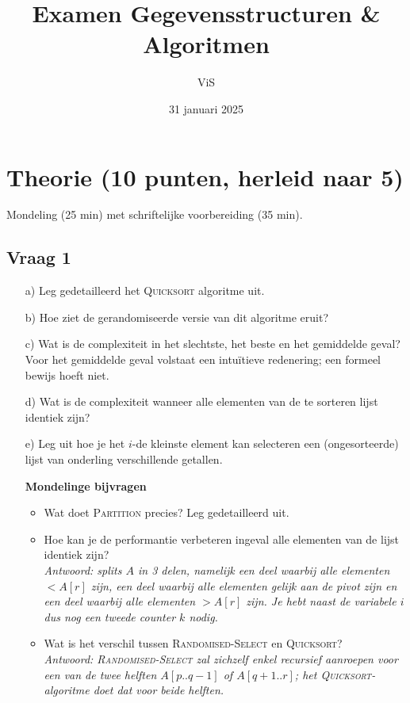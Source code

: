 \documentclass[kulak]{kulakarticle}
\title{Examen Gegevensstructuren \& Algoritmen}
\author{ViS}
\date{31 januari 2025}
\begin{document}
	\maketitle

	\section*{Theorie (10 punten, herleid naar 5)}

	Mondeling (25 min) met schriftelijke voorbereiding (35 min).

	\subsection*{Vraag 1}

	\begin{enumerate}
		\item[a)] Leg gedetailleerd het \textsc{Quicksort} algoritme uit.
		\item[b)] Hoe ziet de gerandomiseerde versie van dit algoritme eruit?
		\item[c)] Wat is de complexiteit in het slechtste, het beste en het gemiddelde geval? Voor het gemiddelde geval volstaat een intuïtieve redenering; een formeel bewijs hoeft niet.
		\item[d)] Wat is de complexiteit wanneer alle elementen van de te sorteren lijst identiek zijn?
		\item[e)] Leg uit hoe je het \(i\)-de kleinste element kan selecteren een (ongesorteerde) lijst van onderling verschillende getallen.
		\item[]\textbf{Mondelinge bijvragen}
		\begin{itemize}
			\item Wat doet \textsc{Partition} precies? Leg gedetailleerd uit.
			\item Hoe kan je de performantie verbeteren ingeval alle elementen van de lijst identiek zijn?\\
			\textit{Antwoord: splits \(A\) in 3 delen, namelijk een deel waarbij alle elementen \(< A[r]\) zijn, een deel waarbij alle elementen gelijk aan de pivot zijn en een deel waarbij alle elementen \(> A[r]\) zijn. Je hebt naast de variabele \(i\) dus nog een tweede counter \(k\) nodig.}
			\item Wat is het verschil tussen \textsc{Randomised-Select} en \textsc{Quicksort}?\\
			\textit{Antwoord: \textsc{Randomised-Select} zal zichzelf enkel recursief aanroepen voor een van de twee helften \(A[ p.. q-1]\) of \(A[q+1 .. r]\); het \textsc{Quicksort}-algoritme doet dat voor beide helften.}
		\end{itemize}
	\end{enumerate}
\end{document}
